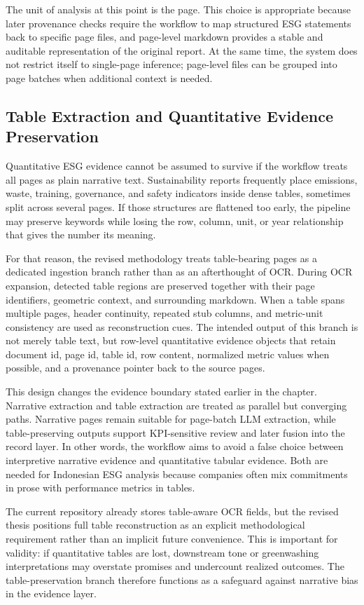 \documentclass[english, online, cse, master]{dithesis}
\begin{document}
The unit of analysis at this point is the page. This choice is appropriate because later provenance checks require the workflow to map structured ESG statements back to specific page files, and page-level markdown provides a stable and auditable representation of the original report. At the same time, the system does not restrict itself to single-page inference; page-level files can be grouped into page batches when additional context is needed.

\subsection{Table Extraction and Quantitative Evidence Preservation}

Quantitative ESG evidence cannot be assumed to survive if the workflow treats all pages as plain narrative text. Sustainability reports frequently place emissions, waste, training, governance, and safety indicators inside dense tables, sometimes split across several pages. If those structures are flattened too early, the pipeline may preserve keywords while losing the row, column, unit, or year relationship that gives the number its meaning.

For that reason, the revised methodology treats table-bearing pages as a dedicated ingestion branch rather than as an afterthought of OCR. During OCR expansion, detected table regions are preserved together with their page identifiers, geometric context, and surrounding markdown. When a table spans multiple pages, header continuity, repeated stub columns, and metric-unit consistency are used as reconstruction cues. The intended output of this branch is not merely table text, but row-level quantitative evidence objects that retain document id, page id, table id, row content, normalized metric values when possible, and a provenance pointer back to the source pages.

This design changes the evidence boundary stated earlier in the chapter. Narrative extraction and table extraction are treated as parallel but converging paths. Narrative pages remain suitable for page-batch LLM extraction, while table-preserving outputs support KPI-sensitive review and later fusion into the record layer. In other words, the workflow aims to avoid a false choice between interpretive narrative evidence and quantitative tabular evidence. Both are needed for Indonesian ESG analysis because companies often mix commitments in prose with performance metrics in tables.

The current repository already stores table-aware OCR fields, but the revised thesis positions full table reconstruction as an explicit methodological requirement rather than an implicit future convenience. This is important for validity: if quantitative tables are lost, downstream tone or greenwashing interpretations may overstate promises and undercount realized outcomes. The table-preservation branch therefore functions as a safeguard against narrative bias in the evidence layer.
\end{document}
